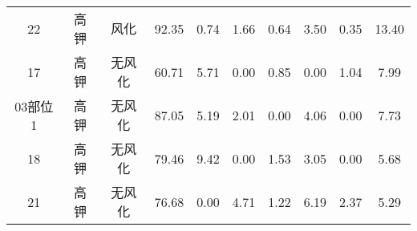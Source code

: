 \documentclass[withoutpreface,bwprint]{cumcmthesis} %
\begin{document}
\begin{appendices}
\begin{table}[!h]
\begin{tabular}{@{}cccccccccc@{}}
		22                                                        & 高钾          & 风化                                                       & 92.35                                                          & 0.74                                                         & 1.66                                                         & 0.64                                                         & 3.50                                                           & 0.35                                                           & 13.40                                                           \\
		17                                                        & 高钾          & 无风化                                                      & 60.71                                                          & 5.71                                                         & 0.00                                                         & 0.85                                                         & 0.00                                                           & 1.04                                                           & 7.99                                                            \\
		03部位1                                                     & 高钾          & 无风化                                                      & 87.05                                                          & 5.19                                                         & 2.01                                                         & 0.00                                                         & 4.06                                                           & 0.00                                                           & 7.73                                                            \\
		18                                                        & 高钾          & 无风化                                                      & 79.46                                                          & 9.42                                                         & 0.00                                                         & 1.53                                                         & 3.05                                                           & 0.00                                                           & 5.68                                                            \\
		21                                                        & 高钾          & 无风化                                                      & 76.68                                                          & 0.00                                                         & 4.71                                                         & 1.22                                                         & 6.19                                                           & 2.37                                                           & 5.29                                                            \\

\end{tabular}
\end{table}
\end{appendices}
\end{document}

